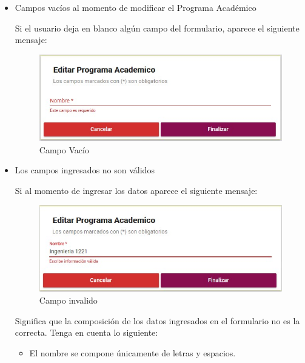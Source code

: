             \begin{itemize}
                \item Campos vacíos al momento de modificar el Programa Académico

                    Si el usuario deja en blanco algún campo del formulario, aparece el siguiente mensaje:

                    \begin{figure}[H]
                    \centering
                    \hypertarget{vacio}{\includegraphics[width=0.7\linewidth]{images/SP3/Vacio}}
                    \caption{Campo Vacío}
                    \label{vacio}
                    \end{figure}

                \item Los campos ingresados no son válidos

                    Si al momento de ingresar los datos aparece el siguiente mensaje:

                     \begin{figure}[H]
                    \centering
                    \hypertarget{invalido}{\includegraphics[width=0.7\linewidth]{images/SP3/Invalida}}
                    \caption{Campo invalido}
                    \label{invalido}
                    \end{figure}


                    Significa que la composición de los datos ingresados en el formulario no es la correcta. Tenga en cuenta lo siguiente:

                    \begin{itemize}
                        \item El nombre se compone únicamente de letras y espacios.


\end{itemize}
\end{itemize}
